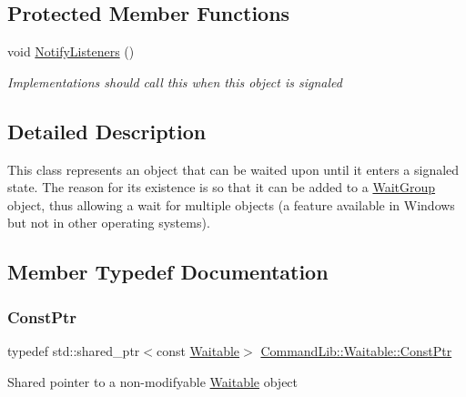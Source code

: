 \subsection*{Protected Member Functions}
\begin{DoxyCompactItemize}
\item 
void \mbox{\hyperlink{class_command_lib_1_1_waitable_a3ea1f52b7ee42671a441b531e4d3cd34}{Notify\+Listeners}} ()
\begin{DoxyCompactList}\small\item\em Implementations should call this when this object is signaled\end{DoxyCompactList}\end{DoxyCompactItemize}


\subsection{Detailed Description}
This class represents an object that can be waited upon until it enters a signaled state. The reason for its existence is so that it can be added to a \mbox{\hyperlink{class_command_lib_1_1_wait_group}{Wait\+Group}} object, thus allowing a wait for multiple objects (a feature available in Windows but not in other operating systems). 



\subsection{Member Typedef Documentation}
\mbox{\label{class_command_lib_1_1_waitable_a2b2652c778560613f9e7dd93be596387}} 
\subsubsection{\texorpdfstring{Const\+Ptr}{ConstPtr}}
{\footnotesize\ttfamily typedef std\+::shared\+\_\+ptr$<$const \mbox{\hyperlink{class_command_lib_1_1_waitable}{Waitable}}$>$ \mbox{\hyperlink{class_command_lib_1_1_waitable_a2b2652c778560613f9e7dd93be596387}{Command\+Lib\+::\+Waitable\+::\+Const\+Ptr}}}



Shared pointer to a non-\/modifyable \mbox{\hyperlink{class_command_lib_1_1_waitable}{Waitable}} object

